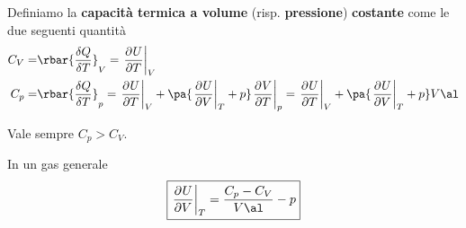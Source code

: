 \begin{definition}
Definiamo la \textbf{capacit\`a termica a volume} (risp. \textbf{pressione}) \textbf{costante} come le due seguenti quantit\`a
\begin{align*}
C_V=&\rbar{\frac{\delta Q}{\delta T}}_V=\ppb TUV\\
C_p=&\rbar{\frac{\delta Q}{\delta T}}_p=\ppb TUV +\pa{\ppb VUT+p}\ppb TVp=\ppb TUV +\pa{\ppb VUT+p}V\al
\end{align*}
\end{definition}

\begin{remark}\label{DisguguaglianzaCapacitaTermiche}
Vale sempre $C_p>C_V$.
\end{remark}

\begin{remark}\label{DerivataEnergiaInternaRispettoAlVolume}
In un gas generale
\[\boxed{\ppb VUT=\frac{C_p-C_V}{V\al}-p}\]
\end{remark}

